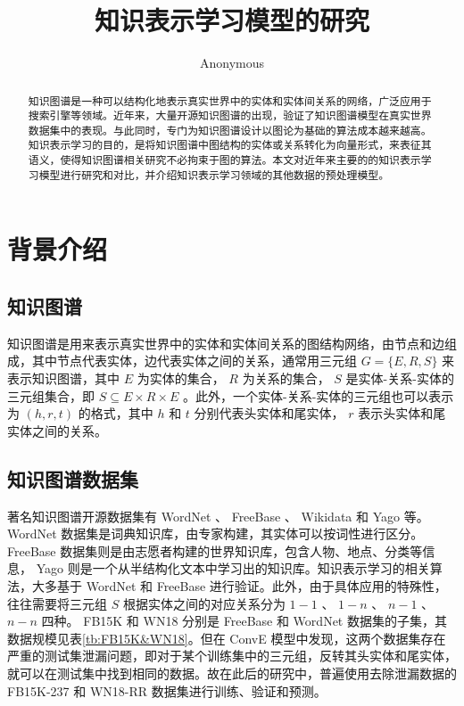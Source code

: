 \documentclass{llncs}
\begin{document}
\title{知识表示学习模型的研究}
\author{Anonymous}
\maketitle

\begin{abstract}

知识图谱是一种可以结构化地表示真实世界中的实体和实体间关系的网络，广泛应用于搜索引擎等领域。近年来，大量开源知识图谱的出现，验证了知识图谱模型在真实世界数据集中的表现。与此同时，专门为知识图谱设计以图论为基础的算法成本越来越高。知识表示学习的目的，是将知识图谱中图结构的实体或关系转化为向量形式，来表征其语义，使得知识图谱相关研究不必拘束于图的算法。本文对近年来主要的的知识表示学习模型进行研究和对比，并介绍知识表示学习领域的其他数据的预处理模型。


\end{abstract}

\section{背景介绍}

\subsection{知识图谱}

知识图谱\cite{DBLP:journals/pieee/Nickel0TG16}是用来表示真实世界中的实体和实体间关系的图结构网络，由节点和边组成，其中节点代表实体，边代表实体之间的关系，通常用三元组 $G=\{E,R,S\}$ 来表示知识图谱，其中 $E$ 为实体的集合， $R$ 为关系的集合， $S$ 是实体-关系-实体的三元组集合，即 $S\subseteq{E×R×E}$ 。此外，一个实体-关系-实体的三元组也可以表示为 $(h,r,t)$ 的格式，其中 $h$ 和 $t$ 分别代表头实体和尾实体， $r$ 表示头实体和尾实体之间的关系。

\subsection{知识图谱数据集}

著名知识图谱开源数据集有 WordNet\cite{Miller:1995:WLD:219717.219748} 、 FreeBase\cite{Bollacker:2008:FCC:1376616.1376746} 、 Wikidata\cite{42240} 和 Yago\cite{suchanek2007yago} 等。 WordNet 数据集是词典知识库，由专家构建，其实体可以按词性进行区分。 FreeBase 数据集则是由志愿者构建的世界知识库，包含人物、地点、分类等信息， Yago 则是一个从半结构化文本中学习出的知识库。知识表示学习的相关算法，大多基于 WordNet 和 FreeBase 进行验证。此外，由于具体应用的特殊性，往往需要将三元组 $S$ 根据实体之间的对应关系分为 $1-1$ 、 $1-n$ 、 $n-1$ 、 $n-n$ 四种。 FB15K 和 WN18 \cite{DBLP:conf/nips/BordesUGWY13}分别是 FreeBase 和 WordNet 数据集的子集，其数据规模见表\ref{tb:FB15K&WN18}。但在 ConvE 模型\cite{DBLP:conf/aaai/DettmersMS018}中发现，这两个数据集存在严重的测试集泄漏问题，即对于某个训练集中的三元组，反转其头实体和尾实体，就可以在测试集中找到相同的数据。故在此后的研究中，普遍使用去除泄漏数据的 FB15K-237 和 WN18-RR 数据集进行训练、验证和预测。
\end{document}
